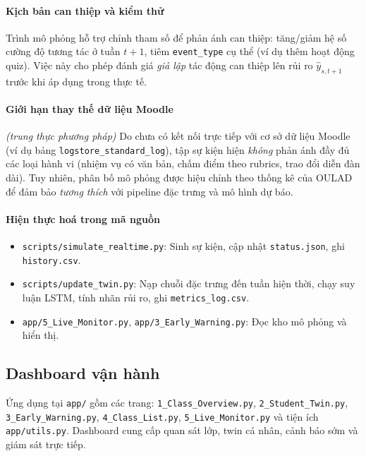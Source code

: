 \documentclass[12pt,a4paper]{article}
\newcommand{\dataset}{OULAD}
\begin{document}
\paragraph{Kịch bản can thiệp và kiểm thử}\label{par:intervention}
Trình mô phỏng hỗ trợ chỉnh tham số để phản ánh can thiệp: tăng/giảm hệ số cường độ tương tác ở tuần $t+1$, tiêm \texttt{event\_type} cụ thể (ví dụ thêm hoạt động quiz). Việc này cho phép đánh giá \emph{giả lập} tác động can thiệp lên rủi ro $\hat{y}_{s,t+1}$ trước khi áp dụng trong thực tế.

\paragraph{Giới hạn thay thế dữ liệu Moodle} \emph{(trung thực phương pháp)}
Do chưa có kết nối trực tiếp với cơ sở dữ liệu Moodle (ví dụ bảng \texttt{logstore\_standard\_log}), tập sự kiện hiện \emph{không} phản ánh đầy đủ các loại hành vi (nhiệm vụ có văn bản, chấm điểm theo rubrics, trao đổi diễn đàn dài). Tuy nhiên, phân bố mô phỏng được hiệu chỉnh theo thống kê của \dataset{} để đảm bảo \emph{tương thích} với pipeline đặc trưng và mô hình dự báo.

\paragraph{Hiện thực hoá trong mã nguồn}
\begin{itemize}
    \item \texttt{scripts/simulate\_realtime.py}: Sinh sự kiện, cập nhật \texttt{status.json}, ghi \texttt{history.csv}.
    \item \texttt{scripts/update\_twin.py}: Nạp chuỗi đặc trưng đến tuần hiện thời, chạy suy luận LSTM, tính nhãn rủi ro, ghi \texttt{metrics\_log.csv}.
    \item \texttt{app/5\_Live\_Monitor.py}, \texttt{app/3\_Early\_Warning.py}: Đọc kho mô phỏng và hiển thị.
\end{itemize}

\subsection{Dashboard vận hành}
Ứng dụng tại \texttt{app/} gồm các trang: \texttt{1\_Class\_Overview.py}, \texttt{2\_Student\_Twin.py}, \texttt{3\_Early\_Warning.py}, \texttt{4\_Class\_List.py}, \texttt{5\_Live\_Monitor.py} và tiện ích \texttt{app/utils.py}. Dashboard cung cấp quan sát lớp, twin cá nhân, cảnh báo sớm và giám sát trực tiếp.
\end{document}
